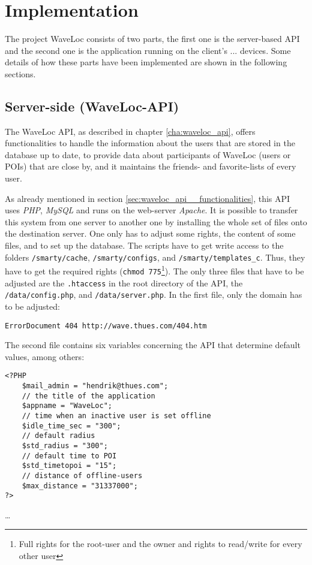 \chapter{Implementation}
\label{cha:implementation}

The project WaveLoc consists of two parts, the first one is the server-based API and the second one is the application running on the client's ... devices. Some details of how these parts have been implemented are shown in the following sections.


\section{Server-side (WaveLoc-API)}
\label{sec:implementation__server_side}

The WaveLoc API, as described in chapter \ref{cha:waveloc_api}, offers functionalities to handle the information about the users that are stored in the database up to date, to provide data about participants of WaveLoc (users or POIs) that are close by, and it maintains the friends- and favorite-lists of every user.

As  already mentioned in section \ref{sec:waveloc_api__functionalities}, this API uses \emph{PHP}, \emph{MySQL} and runs on the web-server \emph{Apache}. It is possible to transfer this system from one server to another one by installing the whole set of files onto the destination server. One only has to adjust some rights, the content of some files, and to set up the database. The scripts have to get write access to the folders \texttt{/smarty/cache}, \texttt{/smarty/configs}, and \texttt{/smarty/templates\_c}. Thus, they have to get the required rights (\texttt{chmod 775}\footnote{Full rights for the root-user and the owner and rights to read/write for every other user}). The only three files that have to be adjusted are the \texttt{.htaccess} in the root directory of the API, the \texttt{/data/config.php}, and  \texttt{/data/server.php}. In the first file, only the domain has to be adjusted:

\begin{lstlisting}
ErrorDocument 404 http://wave.thues.com/404.htm
\end{lstlisting}

\pagebreak
The second file contains six variables concerning the API that determine default values, among others:

\begin{lstlisting}
<?PHP
	$mail_admin = "hendrik@thues.com";
	// the title of the application
	$appname = "WaveLoc";
	// time when an inactive user is set offline
	$idle_time_sec = "300";
	// default radius
	$std_radius = "300";
	// default time to POI
	$std_timetopoi = "15";
	// distance of offline-users 
	$max_distance = "31337000";
?>
\end{lstlisting}

\ldots{}